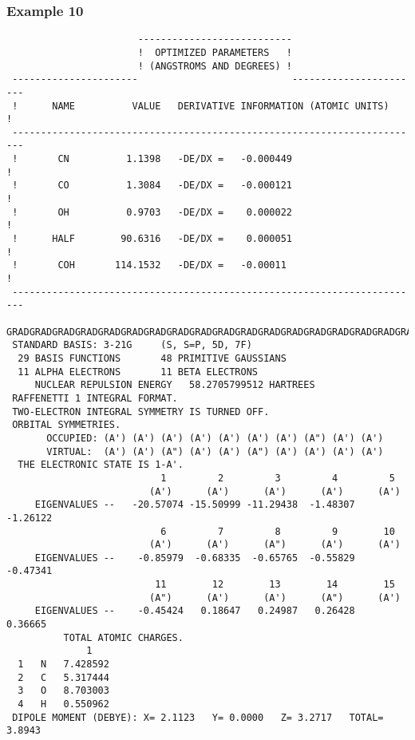 \subsubsection{\sf Example 10}
{\small
\begin{verbatim}
                       ---------------------------
                       !  OPTIMIZED PARAMETERS   !
                       ! (ANGSTROMS AND DEGREES) !
 ----------------------                           -----------------------
 !      NAME          VALUE   DERIVATIVE INFORMATION (ATOMIC UNITS)     !
 ------------------------------------------------------------------------
 !       CN          1.1398   -DE/DX =   -0.000449                      !
 !       CO          1.3084   -DE/DX =   -0.000121                      !
 !       OH          0.9703   -DE/DX =    0.000022                      !
 !      HALF        90.6316   -DE/DX =    0.000051                      !
 !       COH       114.1532   -DE/DX =   -0.00011                       !
 ------------------------------------------------------------------------
 GRADGRADGRADGRADGRADGRADGRADGRADGRADGRADGRADGRADGRADGRADGRADGRADGRADGRAD
 STANDARD BASIS: 3-21G     (S, S=P, 5D, 7F)
  29 BASIS FUNCTIONS       48 PRIMITIVE GAUSSIANS
  11 ALPHA ELECTRONS       11 BETA ELECTRONS
     NUCLEAR REPULSION ENERGY   58.2705799512 HARTREES
 RAFFENETTI 1 INTEGRAL FORMAT.
 TWO-ELECTRON INTEGRAL SYMMETRY IS TURNED OFF.
 ORBITAL SYMMETRIES.
       OCCUPIED: (A') (A') (A') (A') (A') (A') (A') (A") (A') (A')
       VIRTUAL:  (A') (A') (A") (A') (A') (A") (A') (A') (A') (A')
  THE ELECTRONIC STATE IS 1-A'.
                           1         2         3         4         5
                         (A')      (A')      (A')      (A')      (A')
     EIGENVALUES --   -20.57074 -15.50999 -11.29438  -1.48307  -1.26122
                           6         7         8         9        10
                         (A')      (A')      (A")      (A')      (A')
     EIGENVALUES --    -0.85979  -0.68335  -0.65765  -0.55829  -0.47341
                          11        12        13        14        15
                         (A")      (A')      (A')      (A")      (A')
     EIGENVALUES --    -0.45424   0.18647   0.24987   0.26428   0.36665
          TOTAL ATOMIC CHARGES.
              1
  1   N   7.428592
  2   C   5.317444
  3   O   8.703003
  4   H   0.550962
 DIPOLE MOMENT (DEBYE): X= 2.1123   Y= 0.0000   Z= 3.2717   TOTAL= 3.8943
\end{verbatim}
}
\newpage
